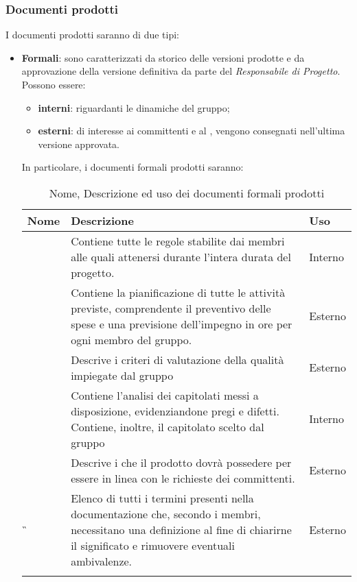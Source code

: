 \subsubsection{Documenti prodotti \hfil}

I documenti prodotti saranno di due tipi:
\begin{itemize}
	\item \textbf{Formali}: sono caratterizzati da storico delle versioni prodotte e da approvazione della versione definitiva da parte del \textit{Responsabile di Progetto}. Possono essere:
	\begin{itemize}
		\item \textbf{interni}: riguardanti le dinamiche del gruppo;
		\item \textbf{esterni}: di interesse ai committenti e al , vengono consegnati nell'ultima versione approvata.
	\end{itemize} 
In particolare, i documenti formali prodotti saranno:
\newpage
{
	\setlength{\freewidth}{\dimexpr\textwidth-1\tabcolsep}
	\renewcommand{\arraystretch}{1.5}
	\setlength{\aboverulesep}{0pt}
	\setlength{\belowrulesep}{0pt}
	\begin{longtable}{L{.210\freewidth} L{.6\freewidth} L{.080\freewidth}}
		\toprule 
		\textbf{Nome} & \textbf{Descrizione} & \textbf{Uso}\\
		\toprule
		\endhead		
		\NdP{} & Contiene tutte le regole stabilite dai membri alle quali attenersi durante l'intera durata del progetto. & Interno \\ 
		\PdP{} & Contiene la pianificazione di tutte le attività previste, comprendente il preventivo delle spese e una previsione dell'impegno in ore per ogni membro del gruppo. & Esterno \\
		\PdQ{} & Descrive i criteri di valutazione della qualità impiegate dal gruppo & Esterno \\ 
		\SdF{} & Contiene l'analisi dei capitolati messi a disposizione, evidenziandone pregi e difetti. Contiene, inoltre, il capitolato scelto dal gruppo & Interno \\
		\AdR{} & Descrive i  che il prodotto dovrà possedere per essere in linea con le richieste dei committenti. & Esterno \\ 	
		\G{} & Elenco di tutti i termini presenti nella documentazione che, secondo i membri, necessitano una definizione al fine di chiarirne il significato e rimuovere eventuali ambivalenze. & Esterno \\  			
		\bottomrule
		\hiderowcolors
		\caption{Nome, Descrizione ed uso dei documenti formali prodotti}
	\end{longtable}
}


\end{itemize}
